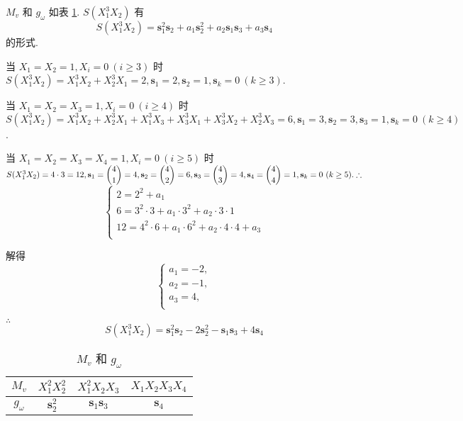\documentclass[UTF8]{ctexart}
\begin{document}
\begin{solution}
    $M_v$ 和 $g_\omega$ 如表 \ref{tb1}. $S(X_1^3X_2)$ 有
    \[S(X_1^3X_2)=\mathbf{s}_1^2\mathbf{s}_2+a_1\mathbf{s}_2^2+a_2\mathbf{s}_1\mathbf{s}_3+a_3\mathbf{s}_4\]
    的形式.

    当 $X_1=X_2=1,X_i=0\ (i\geq3)$ 时 $S(X_1^3X_2)=X_1^3X_2+X_2^3X_1=2,\mathbf{s}_1=2,\mathbf{s}_2=1,\mathbf{s}_k=0\ (k\geq3)$.

    当 $X_1=X_2=X_3=1,X_i=0\ (i\geq4)$ 时 $S(X_1^3X_2)=X_1^3X_2+X_2^3X_1+X_1^3X_3+X_3^3X_1+X_3^3X_2+X_2^3X_3=6,\mathbf{s}_1=3,\mathbf{s}_2=3,\mathbf{s}_3=1,\mathbf{s}_k=0\ (k\geq4)$.

    当 $X_1=X_2=X_3=X_4=1,X_i=0\ (i\geq5)$ 时 $S(X_1^3X_2)=4\cdot3=12,\mathbf{s}_1=\dbinom{4}{1}=4,\mathbf{s}_2=\dbinom{4}{2}=6,\mathbf{s}_3=\dbinom{4}{3}=4,\mathbf{s}_4=\dbinom{4}{4}=1,\mathbf{s}_k=0\ (k\geq5).\therefore$
    \[\begin{cases}
        2=2^2+a_1 \\
        6=3^2\cdot3+a_1\cdot3^2+a_2\cdot3\cdot1 \\
        12=4^2\cdot6+a_1\cdot6^2+a_2\cdot4\cdot4+a_3 \\
    \end{cases}\]

    解得
    \[\begin{cases}
        a_1=-2, \\
        a_2=-1, \\
        a_3=4, \\
    \end{cases}\]

    $\therefore$
    \[S(X_1^3X_2)=\mathbf{s}_1^2\mathbf{s}_2-2\mathbf{s}_2^2-\mathbf{s}_1\mathbf{s}_3+4\mathbf{s}_4\]
    \begin{table}\caption{$M_v$ 和 $g_\omega$}\label{tb1}
        \begin{center}
            \begin{tabular}{c|ccc}
                $M_v$      & $X_1^2X_2^2$ & $X_1^2X_2X_3$ & $X_1X_2X_3X_4$ \\
                \hline
                $g_\omega$ & $\mathbf{s}_2^2$ & $\mathbf{s}_1\mathbf{s}_3$ & $\mathbf{s}_4$ \\
            \end{tabular}
        \end{center}
    \end{table}
\end{solution}
\end{document}
